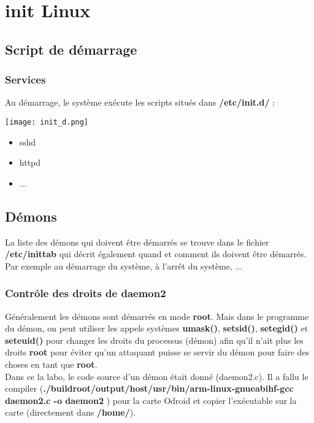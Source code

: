 \chapter{init Linux}
\section{Script de démarrage}
\subsection{Services}

Au démarrage, le système exécute les scripts situés dans \textbf{/etc/init.d/} :

\begin{center} 
\hspace{15cm}
\texttt{[image: init\_d.png]}
\end{center}
\vspace{0.5cm}

\begin{itemize}
	\item sshd
	\item httpd
	\item ...
\end{itemize}

\section{Démons}
La liste des démons qui doivent être démarrés se trouve dans le fichier \textbf{/etc/inittab} qui décrit également quand et comment ils doivent être démarrés. Par exemple au démarrage du système, à l'arrêt du système, ...\\

\subsection{Contrôle des droits de daemon2}

Généralement les démons sont démarrés en mode \textbf{root}. Mais dans le programme du démon, on peut utiliser les appels systèmes \textbf{umask()}, \textbf{setsid()}, \textbf{setegid()} et \textbf{seteuid()} pour changer les droits du processus (démon) afin qu'il n'ait plus les droits \textbf{root} pour éviter qu'un attaquant puisse se servir du démon pour faire des choses en tant que \textbf{root}. \\

Dans ce la labo, le code source d'un démon était donné (daemon2.c). Il a fallu le compiler (\textbf{./buildroot/output/host/usr/bin/arm-linux-gnueabihf-gcc daemon2.c -o daemon2}
) pour la carte Odroid et copier l'exécutable sur la carte (directement dans \textbf{/home/}). \\

